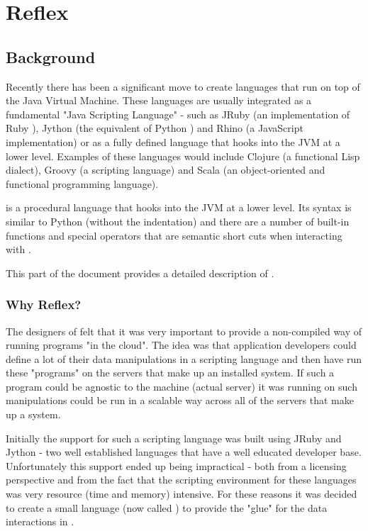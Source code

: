 
\part{Reflex}
\chapter{Background}
Recently there has been a significant move to create languages that run on top of the Java Virtual Machine. These languages are usually integrated as a fundamental "Java Scripting Language" - such as JRuby  (an implementation of Ruby ), Jython  (the equivalent of Python ) and Rhino  (a JavaScript  implementation) or as a fully defined language that hooks into the JVM at a lower level. Examples of these languages would include Clojure  (a functional Lisp dialect), Groovy  (a scripting language) and Scala  (an object-oriented and functional programming language).

\Reflex is a procedural language that hooks into the JVM at a lower level. Its syntax is similar to Python (without the indentation) and there are a number of built-in functions and special operators that are semantic short cuts when interacting with \Rapture.

This part of the document provides a detailed description of \Reflex.

\section{Why Reflex?}
The designers of \Rapture felt that it was very important to provide a non-compiled way of running programs "in the cloud". The idea was that \Rapture application developers could define a lot of their data manipulations in a scripting language and then have \Rapture run these "programs" on the servers that make up an installed system. If such a program could be agnostic to the machine (actual server) it was running on such manipulations could be run in a scalable way across all of the servers that make up a \Rapture system.

Initially the support for such a scripting language was built using JRuby and Jython - two well established languages that have a well educated developer base. Unfortunately this support ended up being impractical - both from a licensing perspective and from the fact that the scripting environment for these languages was very resource (time and memory) intensive. For these reasons it was decided to create a small language (now called \Reflex) to provide the "glue" for the data interactions in \Rapture.

